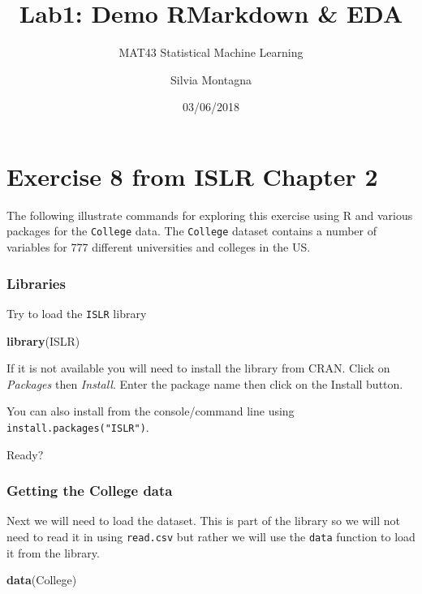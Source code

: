 \documentclass[]{article}
\title{Lab1: Demo RMarkdown \& EDA}
\subtitle{MAT43 Statistical Machine Learning}
\author{Silvia Montagna}
\date{03/06/2018}
\newenvironment{Shaded}{\begin{snugshade}}{\end{snugshade}}
\newcommand{\KeywordTok}[1]{\textcolor[rgb]{0.13,0.29,0.53}{\textbf{#1}}}
\newcommand{\NormalTok}[1]{#1}
\begin{document}
\maketitle

\section{Exercise 8 from ISLR Chapter
2}\label{exercise-8-from-islr-chapter-2}

The following illustrate commands for exploring this exercise using R
and various packages for the \texttt{College} data. The \texttt{College}
dataset contains a number of variables for 777 different universities
and colleges in the US.

\subsubsection{Libraries}\label{libraries}

Try to load the \texttt{ISLR} library

\begin{Shaded}
\begin{Highlighting}[]
\KeywordTok{library}\NormalTok{(ISLR)}
\end{Highlighting}
\end{Shaded}

If it is not available you will need to install the library from CRAN.
Click on \emph{Packages} then \emph{Install}. Enter the package name
then click on the Install button.

You can also install from the console/command line using
\texttt{install.packages("ISLR")}.

Ready?

\subsubsection{Getting the College data}\label{getting-the-college-data}

Next we will need to load the dataset. This is part of the library so we
will not need to read it in using \texttt{read.csv} but rather we will
use the \texttt{data} function to load it from the library.

\begin{Shaded}
\begin{Highlighting}[]
\KeywordTok{data}\NormalTok{(College)}
\end{Highlighting}
\end{Shaded}
\end{document}
